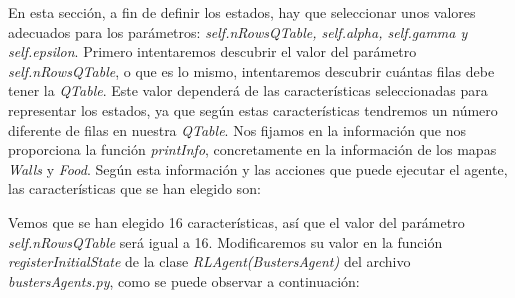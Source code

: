 \documentclass[11pt]{exam}
\begin{document}
En esta sección, a fin de definir los estados, hay que seleccionar unos valores adecuados para los parámetros: \textit{self.nRowsQTable, self.alpha, self.gamma y self.epsilon}. Primero intentaremos descubrir el valor del parámetro \textit{self.nRowsQTable}, o que es lo mismo, intentaremos descubrir cuántas filas debe tener la \textit{QTable}. Este valor dependerá de las características seleccionadas para representar los estados, ya que según estas características tendremos un número diferente de filas en nuestra \textit{QTable}. Nos fijamos en la información que nos proporciona la función \textit{printInfo}, concretamente en la información de los mapas \textit{Walls} y \textit{Food}. Según esta información y las acciones que puede ejecutar el agente, las características que se han elegido son:

\begin{parcolumns}{2}
	\colplacechunks
\end{parcolumns}
\vspace*{3mm}

Vemos que se han elegido 16 características, así que el valor del parámetro \textit{self.nRowsQTable} será igual a 16. Modificaremos su valor en la función \textit{registerInitialState} de la clase \textit{RLAgent(BustersAgent)} del archivo \textit{bustersAgents.py}, como se puede observar a continuación:
\end{document}
